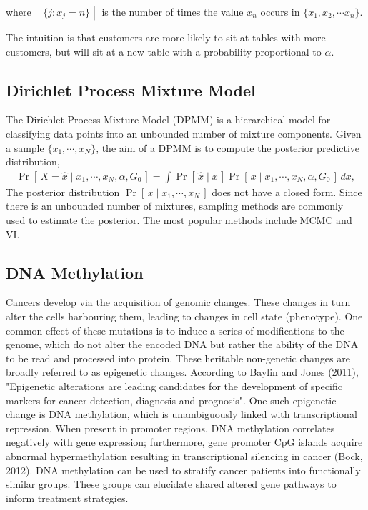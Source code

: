 \documentclass{article}
\newcommand{\prob}[1]{\operatorname{Pr}\left[\,#1\,\right]}
\def\cond{\; | \;}
\begin{document}
where $\cond \{j: x_j = n\}\cond$ is the number of times the value $x_n$ occurs in $\{x_1, x_2, \cdots x_n\}$.


The intuition is that customers are more likely to sit at tables with more customers, but will sit at a new table with a probability proportional to $\alpha$.\\


\subsection{Dirichlet Process Mixture Model}
The Dirichlet Process Mixture Model (DPMM) is a hierarchical model for classifying data points into an unbounded number of mixture components.  Given a sample $\{x_1, \cdots, x_N\}$, the aim of a DPMM is to compute the posterior predictive distribution, 
\begin{align*}
\prob{X = \hat{x}\cond x_1, \cdots, x_N, \alpha, G_0} = \int\prob{\hat{x}\cond x}\prob{x\cond x_1, \cdots, x_N, \alpha, G_0}\,dx,
\end{align*}
The posterior distribution $\prob{x\cond x_1, \cdots, x_N}$ does not have a closed form. Since there is an unbounded number of mixtures, sampling methods are commonly used to estimate the posterior. The most popular methods include MCMC and VI.



\subsection{DNA Methylation}

Cancers develop via the acquisition of genomic changes. These changes in turn alter the cells harbouring them, leading to changes in cell state (phenotype). One common effect of these mutations is to induce a series of modifications to the genome, which do not alter the encoded DNA but rather the ability of the DNA to be read and processed into protein. These heritable non-genetic changes are broadly referred to as epigenetic changes. According to Baylin and Jones (2011), "Epigenetic alterations are leading candidates for the development of specific markers for cancer detection, diagnosis and prognosis". One such epigenetic change is DNA methylation, which is unambiguously linked with transcriptional repression. When present in promoter regions, DNA methylation correlates negatively with gene expression; furthermore, gene promoter CpG islands acquire abnormal hypermethylation resulting in transcriptional silencing in cancer (Bock, 2012). DNA methylation can be used to stratify cancer patients into functionally similar groups. These groups can elucidate shared altered gene pathways to inform treatment strategies.
\end{document}
